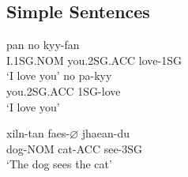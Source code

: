 \documentclass[main.tex]{subfiles}
\begin{document}
\subsection{Simple Sentences}
\begin{exe}
    \ex
        \gll pan no kyy-fan\\
        I.1SG.NOM you.2SG.ACC love-1SG\\
        \trans `I love you'
    \ex
        \gll no pa-kyy\\
        you.2SG.ACC 1SG-love\\
        \trans `I love you'

    \ex \gll xiln-tan faes-$\varnothing$ jhaean-du\\
        dog-NOM cat-ACC see-3SG\\
        \trans `The dog sees the cat'
\end{exe}
\end{document}
